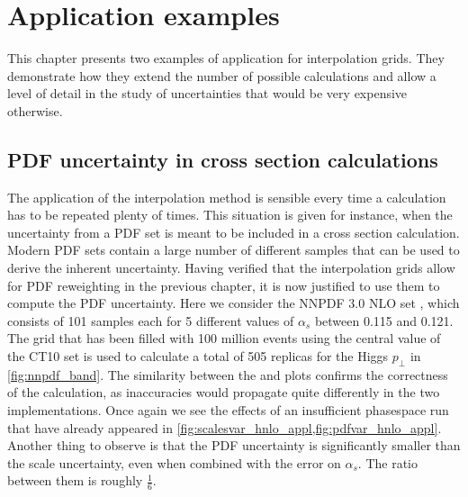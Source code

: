 
\chapter{Application examples}
\label{ch:examples}
This chapter presents two examples of application for interpolation grids.
They demonstrate how they extend the number of possible calculations and allow a level of detail in the study of uncertainties that would be very expensive otherwise.
%
\section{PDF uncertainty in cross section calculations}
The application of the interpolation method is sensible every time a calculation has to be repeated plenty of times.
This situation is given for instance, when the uncertainty from a PDF set is meant to be included in a cross section calculation.
Modern PDF sets contain a large number of different samples that can be used to derive the inherent uncertainty.
Having verified that the interpolation grids allow for PDF reweighting in the previous chapter, it is now justified to use them to compute the PDF uncertainty.
Here we consider the NNPDF 3.0 NLO set \cite{nnpdf30}, which consists of \num{101} samples each for \num{5} different values of $\alpha_s$ between \num{0.115} and \num{0.121}.
The grid that has been filled with 100 million events using the central value of the CT10 set is used to calculate a total of 505 replicas for the Higgs $p_\perp$ in \cref{fig:nnpdf_band}.
The similarity between the \appl{} and \fnlo{} plots confirms the correctness of the calculation, as inaccuracies would propagate quite differently in the two implementations.
Once again we see the effects of an insufficient phasespace run that have already appeared in \cref{fig:scalesvar_hnlo_appl,fig:pdfvar_hnlo_appl}.
Another thing to observe is that the PDF uncertainty is significantly smaller than the scale uncertainty, even when combined with the error on $\alpha_s$.
The ratio between them is roughly $\frac{1}{6}$.
%
